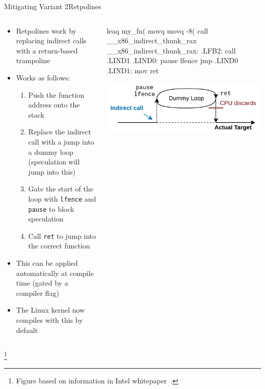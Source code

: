 \documentclass[10pt, dvipsnames, aspectratio=169]{beamer}
\newcommand\ufootnote[1]{%
    \begingroup
        \renewcommand\thefootnote{}\footnote{\hspace{-1.8em}#1}%
        \addtocounter{footnote}{-1}%
    \endgroup
}
\begin{document}
\begingroup
\setwatermark{}
\begin{frame}[c,fragile]{Mitigating Variant 2}{Retpolines}
  \begin{columns}
    \begin{column}[t]{0.5\textwidth}
      \begin{itemize}
        \item Retpolines work by replacing indirect calls with a return-based trampoline
        \item Works as follows:
        \begin{enumerate}
          \item Push the function address onto the stack
          \item Replace the indirect call with a jump into a dummy loop (speculation will jump into this)
          \item Gate the start of the loop with {\tt lfence} and {\tt pause} to block speculation
          \item Call {\tt ret} to jump into the correct function
        \end{enumerate}
        \item This can be applied automatically at compile time (gated by a compiler flag)
        \item The Linux kernel now compiles with this by default
      \end{itemize}
    \end{column}

    \begin{column}[t]{0.5\textwidth}
      \begin{listing}[language=x64,gobble=8,xleftmargin=6em]
        leaq	my_fn(%
        movq	%
        movq	-8(%
        call	__x86_indirect_thunk_rax
        __x86_indirect_thunk_rax:
        .LFB2:
          call	.LIND1
        .LIND0:
          pause
          lfence
          jmp	.LIND0
        .LIND1:
          mov	%
          ret
      \end{listing}
      \vspace{1em}
      \color{black}%
      \includegraphics[width=0.7\columnwidth]{figs/retpoline.pdf}%
    \end{column}
  \end{columns}

  \ufootnote{Figure based on information in Intel whitepaper~\cite{intel_retpoline}.}
\end{frame}
\endgroup
\end{document}
